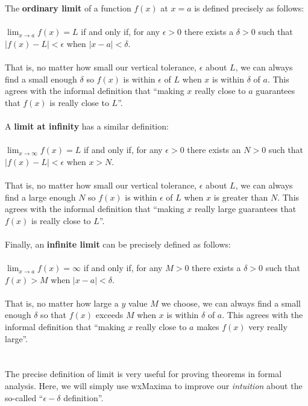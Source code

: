 \documentclass[10.5pt,twoside]{report}
\theoremstyle{definition}
\begin{document}
The \textbf{ordinary limit} of a function $f(x)$ at $x=a$ is defined precisely as follows:\\
${}$\\
$\lim_{x \to a}f(x)=L$ if and only if, for any $\epsilon>0$ there exists a $\delta>0$ such that $|f(x)-L|<\epsilon$ when $|x-a|<\delta$.\\
${}$\\
That is, no matter how small our vertical tolerance, $\epsilon$ about $L$, we can always find a small enough $\delta$ so $f(x)$ is within $\epsilon$ of $L$ when $x$ is within $\delta$ of $a$.  This agrees with the informal definition that ``making $x$ really close to $a$ guarantees that $f(x)$ is really close to $L$''.\\
${}$  \\

A \textbf{limit at infinity} has a similar definition:\\
${}$\\
$\lim_{x \to \infty}f(x)=L$ if and only if, for any $\epsilon>0$ there exists an $N>0$ such that $|f(x)-L|<\epsilon$ when $x>N$.\\
${}$\\
That is, no matter how small our vertical tolerance, $\epsilon$ about $L$, we can always find a large enough $N$ so $f(x)$ is within $\epsilon$ of $L$ when $x$ is greater than $N$.  This agrees with the informal definition that ``making $x$ really large guarantees that $f(x)$ is really close to $L$''.\\
${}$  \\
  
Finally, an \textbf{infinite limit} can be precisely defined as follows:\\
${}$\\
$\lim_{x \to a}f(x)=\infty$ if and only if, for any $M>0$ there exists a $\delta>0$ such that $f(x)>M$ when $|x-a|<\delta$.\\
${}$\\
That is, no matter how large a $y$ value $M$ we choose, we can always find a small enough $\delta$ so that $f(x)$ exceeds $M$ when $x$ is within $\delta$ of $a$.  This agrees with the informal definition that ``making $x$ really close to $a$ makes $f(x)$ very really large''.\\
${}$  \\
  ${}$\\
The precise definition of limit is very useful for proving theorems in formal analysis.  Here, we will simply use wxMaxima to improve our \textit{intuition} about the so-called ``$\epsilon-\delta$ definition''.
\end{document}
